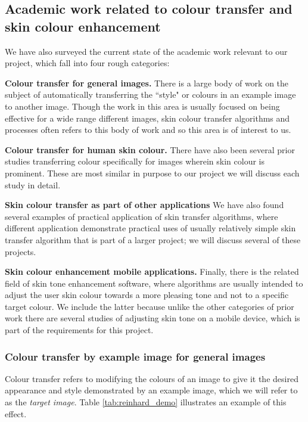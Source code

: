 

\subsection{Academic work related to colour transfer and skin colour enhancement \label{sec:academic_work}}

We have also surveyed the current state of the academic work relevant to our project, which fall into four rough categories:

\textbf{Colour transfer for general images.} There is a large body of work on the subject of automatically transferring the ``style" or colours in an example image to another image. Though the work in this area is usually focused on being effective for a wide range different images, skin colour transfer algorithms and processes often refers to this body of work and so this area is of interest to us.

\textbf{Colour transfer for human skin colour.} There have also been several prior studies transferring colour specifically for images wherein skin colour is prominent. These are most similar in purpose to our project we will discuss each study in detail.

\textbf{Skin colour transfer as part of other applications} We have also found several examples of practical application of skin transfer algorithms, where different application demonstrate practical uses of usually relatively simple skin transfer algorithm that is part of a larger project; we will discuss several of these projects. 

\textbf{Skin colour enhancement mobile applications.} Finally, there is the related field of skin tone enhancement software, where algorithms are usually intended to adjust the user skin colour towards a more pleasing tone and not to a specific target colour. We include the latter because unlike the other categories of prior work there are several studies of adjusting skin tone on a mobile device, which is part of the requirements for this project.

\subsubsection{Colour transfer by example image for general images}
Colour transfer refers to modifying the colours of an image to give it the desired appearance and style demonstrated by an example image, which we will refer to as the \textit{target image}. Table \ref{tab:reinhard_demo} illustrates an example of this effect.

